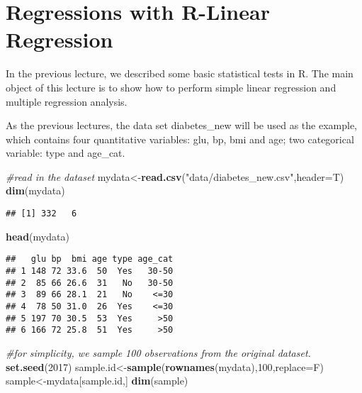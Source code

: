 \documentclass[]{book}
\newenvironment{Shaded}{\begin{snugshade}}{\end{snugshade}}
\newcommand{\KeywordTok}[1]{\textcolor[rgb]{0.13,0.29,0.53}{\textbf{#1}}}
\newcommand{\DataTypeTok}[1]{\textcolor[rgb]{0.13,0.29,0.53}{#1}}
\newcommand{\DecValTok}[1]{\textcolor[rgb]{0.00,0.00,0.81}{#1}}
\newcommand{\StringTok}[1]{\textcolor[rgb]{0.31,0.60,0.02}{#1}}
\newcommand{\CommentTok}[1]{\textcolor[rgb]{0.56,0.35,0.01}{\textit{#1}}}
\newcommand{\NormalTok}[1]{#1}
\theoremstyle{definition}
\theoremstyle{definition}
\theoremstyle{definition}
\theoremstyle{remark}
\begin{document}
\chapter{Regressions with R-Linear
Regression}\label{regressions-with-r-linear-regression}

In the previous lecture, we described some basic statistical tests in R.
The main object of this lecture is to show how to perform simple linear
regression and multiple regression analysis.

As the previous lectures, the data set diabetes\_new will be used as the
example, which contains four quantitative variables: glu, bp, bmi and
age; two categorical variable: type and age\_cat.

\begin{Shaded}
\begin{Highlighting}[]
\CommentTok{#read in the dataset}
\NormalTok{mydata<-}\KeywordTok{read.csv}\NormalTok{(}\StringTok{"data/diabetes_new.csv"}\NormalTok{,}\DataTypeTok{header=}\NormalTok{T)}
\KeywordTok{dim}\NormalTok{(mydata)}
\end{Highlighting}
\end{Shaded}

\begin{verbatim}
## [1] 332   6
\end{verbatim}

\begin{Shaded}
\begin{Highlighting}[]
\KeywordTok{head}\NormalTok{(mydata)}
\end{Highlighting}
\end{Shaded}

\begin{verbatim}
##   glu bp  bmi age type age_cat
## 1 148 72 33.6  50  Yes   30-50
## 2  85 66 26.6  31   No   30-50
## 3  89 66 28.1  21   No    <=30
## 4  78 50 31.0  26  Yes    <=30
## 5 197 70 30.5  53  Yes     >50
## 6 166 72 25.8  51  Yes     >50
\end{verbatim}

\begin{Shaded}
\begin{Highlighting}[]
\CommentTok{#for simplicity, we sample 100 observations from the original dataset.  }
\KeywordTok{set.seed}\NormalTok{(}\DecValTok{2017}\NormalTok{)}
\NormalTok{sample.id<-}\KeywordTok{sample}\NormalTok{(}\KeywordTok{rownames}\NormalTok{(mydata),}\DecValTok{100}\NormalTok{,}\DataTypeTok{replace=}\NormalTok{F)}
\NormalTok{sample<-mydata[sample.id,]}
\KeywordTok{dim}\NormalTok{(sample)}
\end{Highlighting}
\end{Shaded}
\end{document}
